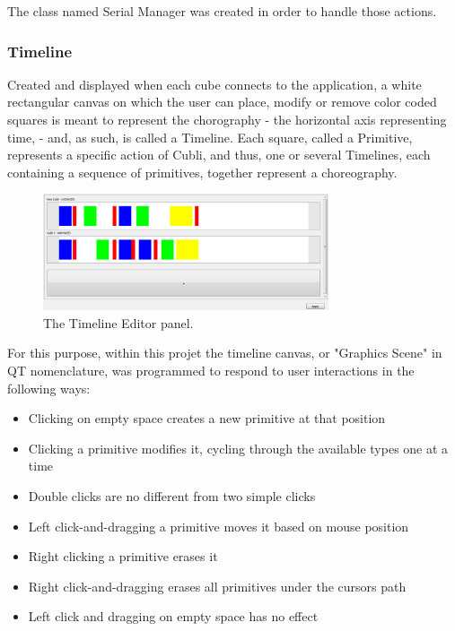The class named Serial Manager was created in order to handle those actions. 

\subsubsection{Timeline}

Created and displayed when each cube connects to the application, a white rectangular canvas on which the user can place, modify or remove color coded squares is meant to represent the chorography - the horizontal axis representing time, - and, as such, is called a Timeline. Each square, called a Primitive, represents a specific action of Cubli, and thus, one or several Timelines, each containing a sequence of primitives, together represent a choreography. \\

\begin{figure}[ht]
   \centering
   \includegraphics[width=0.75\textwidth]{img/TimelinesPanel.png}
   \caption{The Timeline Editor panel.}
   \label{img:TimelinesPanel}
\end{figure}

For this purpose, within this projet the timeline canvas, or "Graphics Scene" in QT nomenclature, was programmed to respond to user interactions in the following ways: 
\begin{itemize}
\item Clicking on empty space creates a new primitive at that position 
\item Clicking a primitive modifies it, cycling through the available types one at a time 
\item Double clicks are no different from two simple clicks 
\item Left click-and-dragging a primitive moves it based on mouse position 
\item Right clicking a primitive erases it 
\item Right click-and-dragging erases all primitives under the cursors path 
\item Left click and dragging on empty space has no effect 
\end{itemize}

